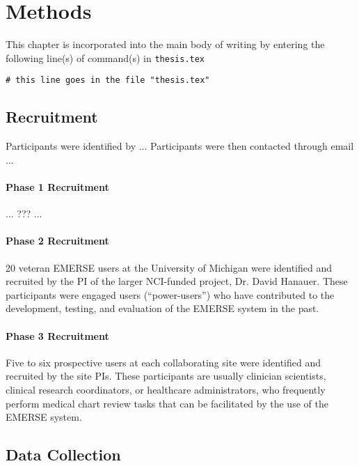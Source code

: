 \chapter{Methods}
This chapter is incorporated into the main body of writing by entering the following line(s) of command(s) in \texttt{thesis.tex}
\begin{verbatim}
# this line goes in the file "thesis.tex"

\end{verbatim}

\section{Recruitment}
Participants were identified by ...
Participants were then contacted through email ...

\subsubsection{Phase 1 Recruitment}
... ??? ...
\subsubsection{Phase 2 Recruitment}
20 veteran EMERSE users at the University of Michigan were identified and recruited by the PI of the larger NCI-funded project, Dr. David Hanauer. These participants were engaged users (``power-users'') who have contributed to the development, testing, and evaluation of the EMERSE system in the past.
\subsubsection{Phase 3 Recruitment}
Five to six prospective users at each collaborating site were identified and recruited by the site PIs. These participants are usually clinician scientists, clinical research coordinators, or healthcare administrators, who frequently perform medical chart review tasks that can be facilitated by the use of the EMERSE system.

\section{Data Collection}



